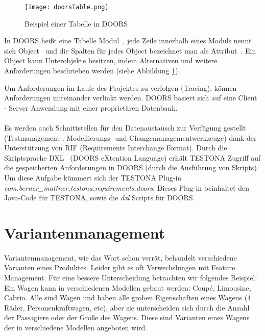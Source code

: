 \begin{figure}[h]
  \begin{center}
    \texttt{[image: doorsTable.png]}
  		  \caption{Beispiel einer Tabelle in DOORS}
     \label{doors.bespiel}
  \end{center}
\end{figure}


In DOORS heißt eine Tabelle \glqq Modul\grqq~, jede Zeile innerhalb eines Moduls nennt sich \glqq Object\grqq~ und die Spalten für jedes Object bezeichnet man als \glqq Attribut\grqq~. Ein Object kann Unterobjekte besitzen, indem Alternativen und weitere Anforderungen beschrieben werden (siehe Abbildung \ref{doors.bespiel}).

Um Anforderungen im Laufe des Projektes zu verfolgen (Tracing), können Anforderungen miteinander verlinkt werden. DOORS basiert sich auf eine Client - Server Anwendung mit einer proprietären Datenbank. \\
\\
Es werden auch Schnittstellen für den Datenaustausch zur Verfügung gestellt (Testmanagement-, Modellierungs- und Changemanagementwerkzeuge) dank der Unterstützung von RIF (Requirements Interchange Format). Durch die Skriptsprache \glqq DXL\grqq~ (DOORS eXtention Language) erhält TESTONA Zugriff auf die gespeicherten Anforderungen in DOORS (durch die Ausführung von Skripts). \cite{Doors} \cite{Anforderungsmanagement}\\

Um diese Aufgabe kümmert sich der TESTONA Plug-in \textit{com.berner\_mattner.testona.requirements.doors}. Dieses Plug-in beinhaltet den Java-Code für TESTONA, sowie die \textit{dxl} Scripts für DOORS.


\newpage
\section{Variantenmanagement}\label{sec:VarManag}
\paragraph{}

Variantenmanagement, wie das Wort schon verrät, behandelt verschiedene Varianten eines Produktes. Leider gibt es oft Verwechslungen mit Feature Management. Für eine bessere Unterscheidung betrachten wir folgendes Beispiel: Ein Wagen kann in verschiedenen Modellen gebaut werden: Coup\'{e}, Limousine, Cabrio. Alle sind Wagen und haben alle groben Eigenschaften eines Wagens (4 Räder, Personenkraftwagen, etc), aber sie unterscheiden sich durch die Anzahl der Passagiere oder der Größe des Wagens. Diese sind Varianten eines Wagens der in verschiedene Modellen angeboten wird. \cite{VarMan1} \\


